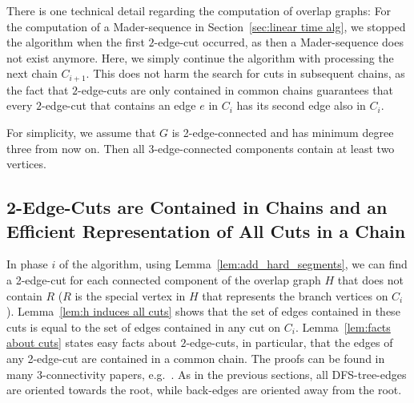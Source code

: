 \documentclass[paper=a4]{scrartcl}
\begin{document}
There is one technical detail regarding the computation of overlap graphs: For the computation of a Mader-sequence in Section~\ref{sec:linear time alg}, we stopped the algorithm when the first $2$-edge-cut occurred, as then a Mader-sequence does not exist anymore. Here, we simply continue the algorithm with processing the next chain $C_{i+1}$. This does not harm the search for cuts in subsequent chains, as the fact that $2$-edge-cuts are only contained in common chains guarantees that every $2$-edge-cut that contains an edge $e$ in $C_i$ has its second edge also in $C_i$.


For simplicity, we assume that $G$ is 2-edge-connected and has minimum degree three from now on. Then all 3-edge-connected components contain at least two vertices. 


\subsection{2-Edge-Cuts are Contained in Chains and an Efficient Representation of All Cuts in a Chain}\label{sec:efficient cut representation}

In phase $i$ of the algorithm, using Lemma~\ref{lem:add_hard_segments}, we can find a 2-edge-cut for each connected component of the overlap graph $H$ that does not contain $R$ ($R$ is the special vertex in $H$ that represents the branch vertices on $C_i$). Lemma~\ref{lem:h induces all cuts} shows that the set of edges contained in these cuts is equal to the set of edges contained in any cut on $C_i$.
Lemma~\ref{lem:facts about cuts} states easy facts about $2$-edge-cuts, in particular, that the edges of any 2-edge-cut are contained in a common chain. The proofs can be found in many 3-connectivity papers, e.g.~\cite{Nagamochi1992a,Taoka1992,Tsin2007,Tsin2009}. As in the previous sections, all DFS-tree-edges are oriented towards the root, while back-edges are oriented away from the root.
\end{document}
